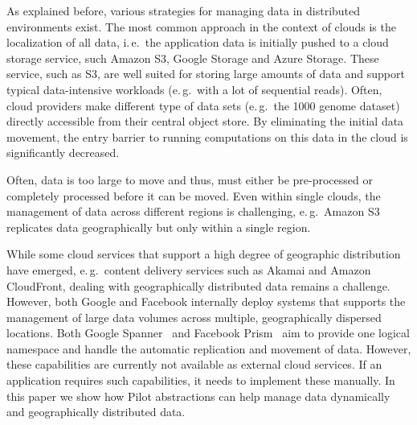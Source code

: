 \documentclass[times]{cpeauth}
\newcommand{\pilot}{Pilot\xspace}
\begin{document}
As explained before, various strategies for managing data in distributed
environments exist. The most common approach in the context of clouds is the
localization of all data, i.\,e.\ the application data is initially pushed to
a cloud storage service, such Amazon S3, Google Storage and Azure Storage.
These service, such as S3, are well suited for storing large amounts of data 
and support typical data-intensive workloads (e.\,g.\ with a lot of sequential
reads). Often, cloud providers make different type of data sets (e.\,g.\ the
1000 genome dataset) directly accessible from their central object store. By
eliminating the initial data movement, the entry barrier to running
computations on this data in the cloud is significantly decreased.

Often, data is too large to move and thus, must either be
pre-processed or completely processed before it can be moved. Even within
single clouds, the management of data across different regions is challenging, 
e.\,g.\ Amazon S3  replicates data geographically but only within a single
region.

While some cloud services that support a high degree of geographic
distribution have emerged, e.\,g.\ content delivery services such as
Akamai and Amazon CloudFront, dealing with geographically distributed
data remains a challenge. However, both Google and Facebook internally
deploy systems that supports the management of large data volumes
across multiple, geographically dispersed locations. Both Google
Spanner~\cite{dean09} and Facebook Prism~\cite{Metz12} aim to provide
one logical namespace and handle the automatic replication and
movement of data. However, these capabilities are currently not
available as external cloud services. If an application requires such
capabilities, it needs to implement these manually.  In this paper we
show how \pilot abstractions can help manage data dynamically and
geographically distributed data.
\end{document}
